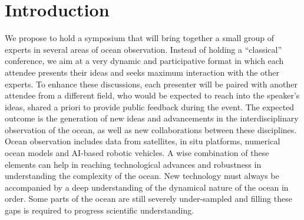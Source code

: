\section{Introduction}

We propose to hold a symposium that will bring together a small group of
experts in several areas of ocean observation. Instead of holding a
“classical” conference, we aim at a very dynamic and participative
format in which each attendee presents their ideas and seeks maximum
interaction with the other experts. To enhance these discussions, each
presenter will be paired with another attendee from a different field,
who would be expected to reach into the speaker’s ideas, shared a priori
to provide public feedback during the event. The expected outcome is the
generation of new ideas and advancements in the interdisciplinary
observation of the ocean, as well as new collaborations between these
disciplines. Ocean observation includes data from satellites, in situ
platforms, numerical ocean models and AI-based robotic vehicles. A wise
combination of these elements can help in reaching technological
advances and robustness in understanding the complexity of the
ocean. New technology must always be accompanied by a deep understanding
of the dynamical nature of the ocean in order. Some parts of the ocean
are still severely under-sampled and filling these gaps is required to
progress scientific understanding.

